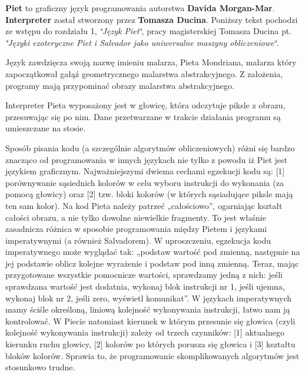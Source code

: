 {\bf Piet} to graficzny język programowania autorstwa {\bf Davida Morgan-Mar}. {\bf Interpreter} został stworzony przez {\bf Tomasza Ducina}. Poniższy tekst pochodzi ze wstępu do rozdziału 1, {\em \char`\"{}Język Piet\char`\"{}\/}, pracy magisterskiej Tomasza Ducina pt. {\em \char`\"{}Języki ezoteryczne Piet i Salvador jako uniwersalne maszyny obliczeniowe\char`\"{}\/}.

Język zawdzięcza swoją nazwę imieniu malarza, Pieta Mondriana, malarza który zapoczątkował gałąź geometrycznego malarstwa abstrakcyjnego. Z założenia, programy mają przypominać obrazy malarstwa abstrakcyjnego.

Interpreter Pieta wyposażony jest w głowicę, która odczytuje piksle z obrazu, przesuwając się po nim. Dane przetwarzane w trakcie działania programu są umieszczane na stosie.

Sposób pisania kodu (a szczególnie algorytmów obliczeniowych) różni się bardzo znacząco od programowania w innych językach nie tylko z powodu iż Piet jest językiem graficznym. Najważniejszymi dwiema cechami egzekucji kodu są: \mbox{[}1\mbox{]} porównywanie sąsiednich kolorów w celu wyboru instrukcji do wykonania (za pomocą głowicy) oraz \mbox{[}2\mbox{]} tzw. bloki kolorów (w których sąsiadujące piksle mają ten sam kolor). Na kod Pieta należy patrzeć „całościowo”, ogarniając kształt całości obrazu, a nie tylko dowolne niewielkie fragmenty. To jest właśnie zasadnicza różnica w sposobie programowania między Pietem i językami imperatywnymi (a również Salvadorem). W uproszczeniu, egzekucja kodu imperatywnego może wyglądać tak: „podstaw wartość pod zmienną, następnie na jej podstawie oblicz kolejne wyrażenie i podstaw pod inną zmienną. Teraz, mając przygotowane wszystkie pomocnicze wartości, sprawdzamy jedną z nich: jeśli sprawdzana wartość jest dodatnia, wykonaj blok instrukcji nr 1, jeśli ujemna, wykonaj blok nr 2, jeśli zero, wyświetl komunikat”. W językach imperatywnych mamy ściśle określoną, liniową kolejność wykonywania instrukcji, łatwo nam ją kontrolować. W Piecie natomiast kierunek w którym przesunie się głowica (czyli kolejność wykonywania instrukcji) zależy od trzech czynników: \mbox{[}1\mbox{]} aktualnego kierunku ruchu głowicy, \mbox{[}2\mbox{]} kolorów po których porusza się głowica i \mbox{[}3\mbox{]} kształtu bloków kolorów. Sprawia to, że programowanie skomplikowanych algorytmów jest stosunkowo trudne. 